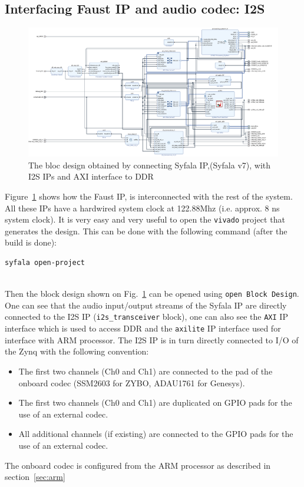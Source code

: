 \documentclass[11pt]{article}
\numberwithin{equation}{section}
\numberwithin{figure}{section}
\newcommand{\syfala}{{Syfala}\xspace}
\begin{document}
\subsection{Interfacing Faust IP and audio codec: I2S}
\begin{figure}[ht]
  \centerline{\includegraphics[width=16cm]{design_v7.png}}
  \caption{The bloc design obtained by connecting Syfala IP,(\syfala v7), with I2S IPs and AXI interface to DDR}
  \label{fig:design_6_3}
\end{figure}

Figure~\ref{fig:design_6_3} shows how the Faust IP, is interconnected with the rest of the system. All these IPs have a hardwired system clock at 122.88Mhz (i.e. approx. 8 ns system clock). It is very easy and very useful to open the {\tt vivado} project that generates the design. This can be done with the following command (after the build is done):
\begin{verbatim}
syfala open-project
\end{verbatim}\\
Then the  block design shown on Fig.~\ref{fig:design_6_3} can be opened using {\tt open Block Design}. One can see that the audio input/output streams of the Syfala IP are directly connected to the I2S IP ({\tt i2s\_transceiver} block), one can also see the {\tt AXI} IP interface which is used to access DDR and the {\tt axilite} IP interface used for interface with ARM processor.  The I2S IP is in turn directly connected to I/O of the Zynq with the following convention:
\begin{itemize}
\item The first two channels (Ch0 and Ch1) are connected to the pad of the onboard codec (SSM2603 for ZYBO, ADAU1761 for Genesys).
\item The first two channels (Ch0 and Ch1) are duplicated on GPIO pads for the use of an external codec.
\item All additional channels (if existing) are connected to the GPIO pads for the use of an external codec.
\end{itemize}
The onboard codec is configured from the ARM processor as described in section~\ref{sec:arm}\\
\end{document}
